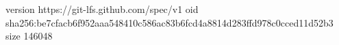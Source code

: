 version https://git-lfs.github.com/spec/v1
oid sha256:be7cfacb6f952aaa548410c586ac83b6fcd4a8814d283ffd978c0cced11d52b3
size 146048
